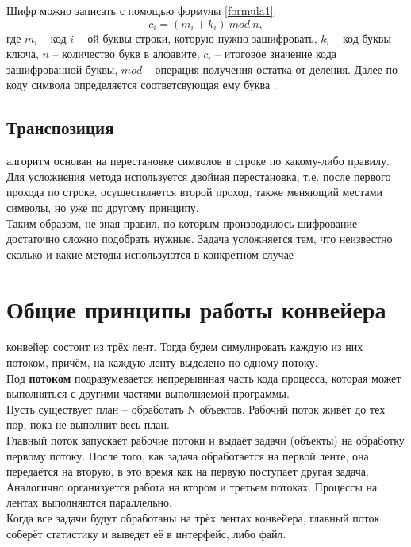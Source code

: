 Шифр можно записать с помощью формулы \ref{formula1}.
\begin{equation}\label{formula1}
	c_i = (m_i + k_i)\:mod\:n,
\end{equation}
где $m_i$ -- код $i-$ой буквы строки, которую нужно зашифровать, $k_i$ -- код буквы ключа, $n$ -- количество букв в алфавите, $c_i$ -- итоговое значение кода зашифрованной буквы, $mod$ -- операция получения остатка от деления. Далее по коду символа определяется соответсвующая ему буква \cite{cript}.

\subsection{Транспозиция}
 алгоритм основан на перестановке символов в строке по какому-либо правилу. Для усложнения метода используется двойная перестановка, т.е. после первого прохода по строке, осуществляется второй проход, также меняющий местами символы, но уже по другому принципу.\\

Таким образом, не зная правил, по которым производилось шифрование достаточно сложно подобрать нужные. Задача усложняется тем, что неизвестно сколько и какие методы используются в конкретном случае \cite{cript2}

\section{Общие принципы работы конвейера}
 конвейер состоит из трёх лент. Тогда будем симулировать каждую из них потоком, причём, на каждую ленту выделено по одному потоку.\\

Под \textbf{потоком} подразумевается непрерывнная часть кода процесса, которая может выполняться с другими частями выполняемой программы.\\

Пусть существует план -- обработать N объектов. Рабочий поток живёт до тех пор, пока не выполнит весь план.\\

Главный поток запускает рабочие потоки и выдаёт задачи (объекты) на обработку первому потоку. После того, как задача обработается на первой ленте, она передаётся на вторую, в это время как на первую поступает другая задача. Аналогично организуется работа на втором и третьем потоках. Процессы на лентах выполняются параллельно.\\

Когда все задачи будут обработаны на трёх лентах конвейера, главный поток соберёт статистику и выведет её в интерфейс, либо файл.\\

